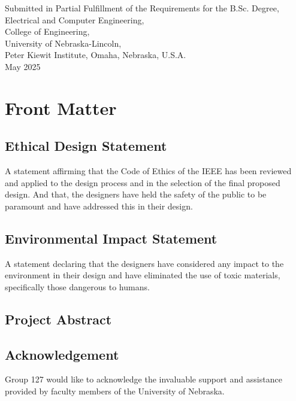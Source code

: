 \documentclass[12pt]{article}
\begin{document}
\begin{titlepage}
\begin{center}
        \vspace{3cm}
        
        \small Submitted in Partial Fulfillment of the Requirements for the B.Sc. Degree,\\
        \small Electrical and Computer Engineering,\\
        \small College of Engineering,\\
        \small University of Nebraska-Lincoln,\\
        \small Peter Kiewit Institute, Omaha, Nebraska, U.S.A.\\
        \small May 2025\\
    \end{center}
    \thispagestyle{empty}
\end{titlepage}

\newpage

\section*{Front Matter}

\subsection*{Ethical Design Statement}
A statement affirming that the Code of Ethics of the IEEE has been reviewed and applied to the design process and in the selection of the final proposed design. And that, the designers have held the safety of the public to be paramount and have addressed this in their design.

\subsection*{Environmental Impact Statement}
A statement declaring that the designers have considered any impact to the environment in their design and have eliminated the use of toxic materials, specifically those dangerous to humans.

\subsection*{Project Abstract}

\subsection*{Acknowledgement}
Group 127 would like to acknowledge the invaluable support and assistance provided by faculty members of the University of Nebraska.
\end{document}
